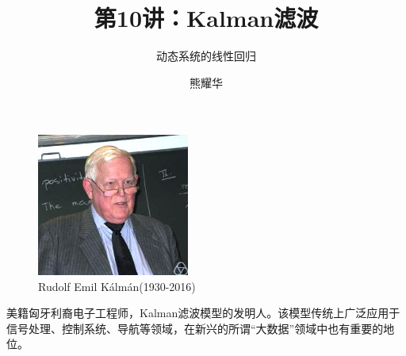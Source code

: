 \documentclass[14pt]{beamer}
\title{第10讲：Kalman滤波}
\subtitle{动态系统的线性回归}
\author{熊耀华}
\institute{交通工程系}
\begin{document}
\begin{frame}
    \titlepage
\end{frame}

\begin{frame}
  \begin{figure}
    \centering
    \includegraphics[width=5cm]{rudolf_kalman.jpg}
    \caption{Rudolf Emil K\'alm\'an(1930-2016)}
  \end{figure}

  \small 美籍匈牙利裔电子工程师，Kalman滤波模型的发明人。该模型传统上广泛应用于
  信号处理、控制系统、导航等领域，在新兴的所谓“大数据”领域中也有重要的地位。
\end{frame}
\end{document}
